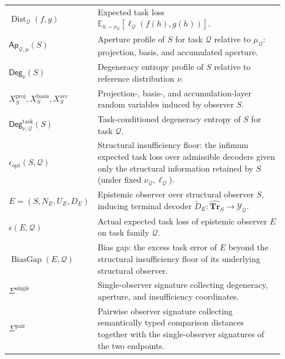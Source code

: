 \documentclass[11pt,twoside]{article}
\theoremstyle{definition}
\newcommand{\Tr}{\mathbf{Tr}}
\newcommand{\proj}{\mathrm{proj}}
\newcommand{\basis}{\mathrm{basis}}
\newcommand{\acc}{\mathrm{acc}}
\newcommand{\task}{\mathrm{task}}
\DeclareMathOperator{\BiasGap}{BiasGap}
\DeclareMathOperator{\Dist}{Dist}
\begin{document}
\begin{center}
\begin{tabular}{p{0.23\linewidth} p{0.70\linewidth}}
\(\Dist_{\mathcal{Q}}(f,g)\) &
Expected task loss \(\mathbb{E}_{h\sim\nu_{\mathcal{Q}}}[\ell_{\mathcal{Q}}(f(h),g(h))]\). \\[4pt]

\(\mathsf{Ap}_{\mathcal{Q},\mu}(S)\) &
Aperture profile of \(S\) for task \(\mathcal{Q}\) relative to \(\mu_{\mathcal{Q}}\): projection, basis, and accumulated aperture. \\[4pt]

\(\mathsf{Deg}_{\nu}(S)\) &
Degeneracy entropy profile of \(S\) relative to reference distribution \(\nu\). \\[4pt]

\(X_S^{\proj},X_S^{\basis},X_S^{\acc}\) &
Projection-, basis-, and accumulation-layer random variables induced by observer \(S\). \\[4pt]

\(\mathsf{Deg}^{\task}_{\nu,\mathcal{Q}}(S)\) &
Task-conditioned degeneracy entropy of \(S\) for task \(\mathcal{Q}\). \\[4pt]

\(\epsilon_{\mathrm{opt}}(S,\mathcal{Q})\) &
Structural insufficiency floor: the infimum expected task loss over admissible decoders given only the structural information retained by \(S\) (under fixed \(\nu_{\mathcal{Q}},\ell_{\mathcal{Q}}\)). \\[4pt]

\(E=(S,N_E,U_E,D_E)\) &
Epistemic observer over structural observer \(S\), inducing terminal decoder \(\widetilde{D}_E:\widehat{\Tr}_S\to\mathcal{Y}_{\mathcal{Q}}\). \\[4pt]

\(\epsilon(E,\mathcal{Q})\) &
Actual expected task loss of epistemic observer \(E\) on task family \(\mathcal{Q}\). \\[4pt]

\(\BiasGap(E,\mathcal{Q})\) &
Bias gap: the excess task error of \(E\) beyond the structural insufficiency floor of its underlying structural observer. \\[4pt]

\(\Sigma^{\mathrm{single}}\) &
Single-observer signature collecting degeneracy, aperture, and insufficiency coordinates. \\[4pt]

\(\Sigma^{\mathrm{pair}}\) &
Pairwise observer signature collecting semantically typed comparison distances together with the single-observer signatures of the two endpoints. \\[4pt]


\end{tabular}
\end{center}
\end{document}
